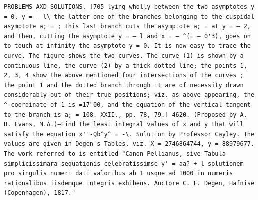 \documentclass[11pt,a4paper]{book}
\begin{document}
\newpage
\setcounter{page}{586}
\begin{verbatim}
PROBLEMS AXD SOLUTIONS. [705 lying wholly between the two asymptotes y = 0, y = — l\ the latter one of the branches belonging to the cuspidal asymptote a; = ; this last branch cuts the asymptote a; = at y = — 2, and then, cutting the asymptote y = — l and x = — ^{= — 0'3), goes on to touch at infinity the asymptote y = 0. It is now easy to trace the curve. The figure shows the two curves. The curve (1) is shown by a continuous line, the curve (2) by a thick dotted line; the points 1, 2, 3, 4 show the above mentioned four intersections of the curves ; the point 1 and the dotted branch through it are of necessity drawn considerably out of their true positions; viz. as above appearing, the ^-coordinate of 1 is =17"00, and the equation of the vertical tangent to the branch is a; = 108. XXII., pp. 78, 79.] 4620. (Proposed by A. B. Evans, M.A.)—Find the least integral values of x and y that will satisfy the equation x''-Qb^y^ = -\. Solution by Professor Cayley. The values are given in Degen's Tables, viz. X = 2746864744, y = 88979677. The work referred to is entitled "Canon Pellianus, sive Tabula simplicissimara sequationis celebratissimse y' = aa? + l solutionem pro singulis numeri dati valoribus ab 1 usque ad 1000 in numeris rationalibus iisdemque integris exhibens. Auctore C. F. Degen, Hafnise (Copenhagen), 1817." 
\end{verbatim}
\end{document}
